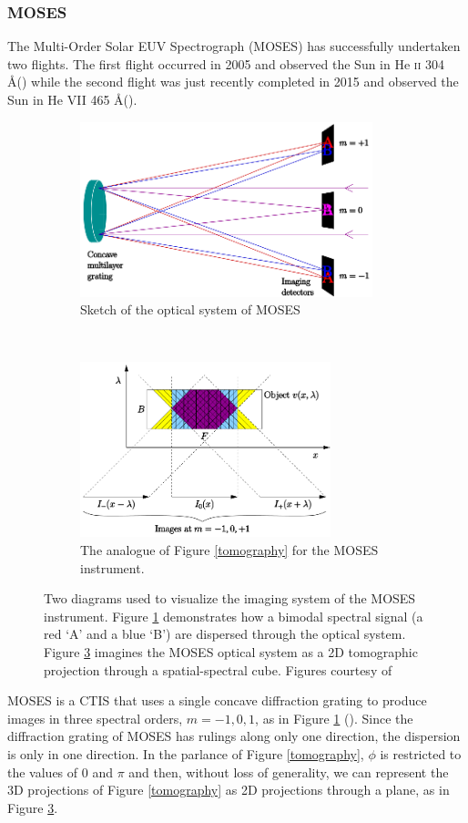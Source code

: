 \documentclass{article}
\begin{document}
			\subsubsection{MOSES}

				The Multi-Order Solar EUV Spectrograph (MOSES) has successfully undertaken two flights. The first flight occurred in 2005 and observed the Sun in He \textsc{ii} 304 \AA (\cite{fox1}) while the second flight was just recently completed in 2015 and observed the Sun in He VII 465 \AA (\cite{smart1}). 
				
				 		
				\begin{figure}[h!]
					\centering
					\begin{subfigure}[t]{0.49\textwidth}
						\centering
						\includegraphics[height=2in]{figures/concave}
						\caption{Sketch of the optical system of MOSES}
						\label{optics}
					\end{subfigure}	
					~
					\begin{subfigure}[t]{0.49\textwidth}
						\centering
						\includegraphics[height=2in]{figures/moses_cube}
						\caption{The analogue of Figure \ref{tomography} for the MOSES instrument.}
						\label{moses_tomo}
					\end{subfigure}	
					\caption{Two diagrams used to visualize the imaging system of the MOSES instrument. Figure \ref{optics} demonstrates how a bimodal spectral signal (a red `A' and a blue `B') are dispersed through the optical system. Figure \ref{moses_tomo} imagines the MOSES optical system as a 2D tomographic projection through a spatial-spectral cube. Figures courtesy of \cite{fox1}}
				\end{figure}
				MOSES is a CTIS that uses a single concave diffraction grating to produce images in three spectral orders, $m=-1,0,1$, as in Figure \ref{optics} (\cite{kankel1}).
				Since the diffraction grating of MOSES has rulings along only one direction, the dispersion is only in one direction. In the parlance of Figure \ref{tomography}, $\phi$ is restricted to the values of 0 and $\pi$ and then, without loss of generality, we can represent the 3D projections of Figure \ref{tomography} as 2D projections through a plane, as in Figure \ref{moses_tomo}.
				
\end{document}
